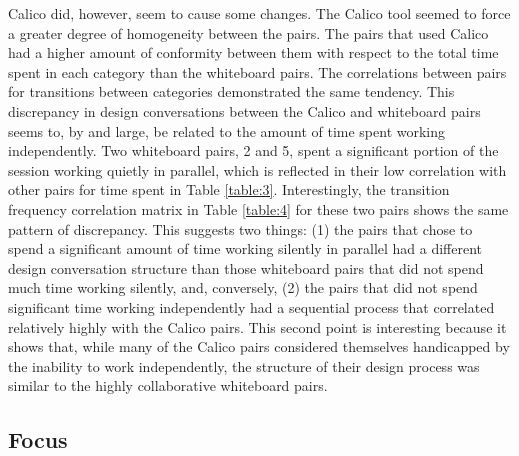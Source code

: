 \documentclass[12pt,fleqn]{ucithesis}
\begin{document}
Calico did, however, seem to cause some changes. The Calico tool seemed to force a greater degree of homogeneity between the pairs. The pairs that used Calico had a higher amount of conformity between them with respect to the total time spent in each category than the whiteboard pairs. The correlations between pairs for transitions between categories demonstrated the same tendency. This discrepancy in design conversations between the Calico and whiteboard pairs seems to, by and large, be related to the amount of time spent working independently. Two whiteboard pairs, 2 and 5, spent a significant portion of the session working quietly in parallel, which is reflected in their low correlation with other pairs for time spent in Table \ref{table:3}. Interestingly, the transition frequency correlation matrix in Table \ref{table:4} for these two pairs shows the same pattern of discrepancy. This suggests two things: (1) the pairs that chose to spend a significant amount of time working silently in parallel had a different design conversation structure than those whiteboard pairs that did not spend much time working silently, and, conversely, (2) the pairs that did not spend significant time working independently had a sequential process that correlated relatively highly with the Calico pairs. This second point is interesting because it shows that, while many of the Calico pairs considered themselves handicapped by the inability to work independently, the structure of their design process was similar to the highly collaborative whiteboard pairs. 

\subsection {Focus}
\label{discussion:4}
\end{document}
